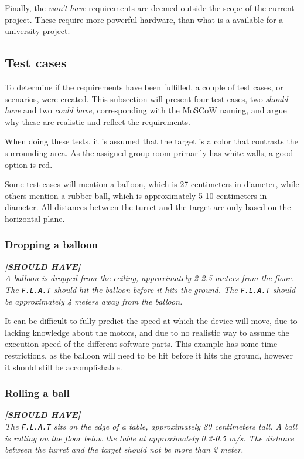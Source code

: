 Finally, the \textit{won't have} requirements are deemed outside the scope of the current project.
These require more powerful hardware, than what is a available for a university project.

\subsection{Test cases}
To determine if the requirements have been fulfilled, a couple of test cases, or scenarios, were created.
This subsection will present four test cases, two \textit{should have} and two \textit{could have}, corresponding with the MoSCoW naming, and argue why these are realistic and reflect the requirements.


When doing these tests, it is assumed that the target is a color that contrasts the surrounding area.
As the assigned group room primarily has white walls, a good option is red.


Some test-cases will mention a balloon, which is 27 centimeters in diameter, while others mention a rubber ball, which is approximately 5-10 centimeters in diameter.
All distances between the turret and the target are only based on the horizontal plane.

\subsubsection{Dropping a balloon}
\textit{\textbf{[SHOULD HAVE]}}\\
\textit{A balloon is dropped from the ceiling, approximately 2-2.5 meters from the floor.
The \texttt{F.L.A.T} should hit the balloon before it hits the ground.
The \texttt{F.L.A.T} should be approximately 4 meters away from the balloon.}

It can be difficult to fully predict the speed at which the device will move, due to lacking knowledge about the motors, and due to no realistic way to assume the execution speed of the different software parts.
This example has some time restrictions, as the balloon will need to be hit before it hits the ground, however it should still be accomplishable.

\subsubsection{Rolling a ball}
\textit{\textbf{[SHOULD HAVE]}}\\
\textit{The \texttt{F.L.A.T} sits on the edge of a table, approximately 80 centimeters tall.
A ball is rolling on the floor below the table at approximately 0.2-0.5 m/s.
The distance between the turret and the target should not be more than 2 meter.}

